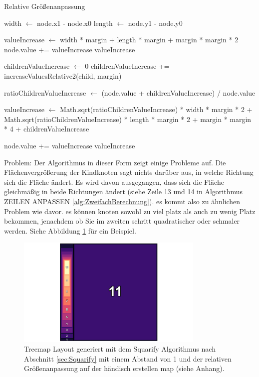 \begin{algorithm}[H]
\caption{Relative Größenanpassung}
\label{alg:ZweifachBerechnung}
\begin{algorithmic}[1]
    \State width $\gets$ node.x1 - node.x0
    \State length $\gets$ node.y1 - node.y0

        \State valueIncrease $\gets$ width * margin + length * margin + margin * margin * 2
        \State node.value += valueIncrease
        \State \Return valueIncrease
    \EndIf

    \State childrenValueIncrease $\gets$ 0
            \State childrenValueIncrease += increaseValuesRelative2(child, margin)
        \EndFor
    \EndIf

    \State ratioChildrenValueIncrease $\gets$ (node.value + childrenValueIncrease) / node.value

    \State valueIncrease $\gets$ 
        Math.sqrt(ratioChildrenValueIncrease) * width * margin * 2 +
        Math.sqrt(ratioChildrenValueIncrease) * length * margin * 2 +
    margin * margin * 4 +
        childrenValueIncrease

    \State node.value += valueIncrease
    \State \Return valueIncrease
\EndFunction
\end{algorithmic}
\end{algorithm}

Problem:
Der Algorithmus in dieser Form zeigt einige Probleme auf. Die Flächenvergrößerung der Kindknoten sagt nichts darüber aus, in welche Richtung sich die Fläche ändert. Es wird davon ausgegangen, dass sich die Fläche gleichmäßig in beide Richtungen ändert (siehe Zeile 13 und 14 in Algorithmus ZEILEN ANPASSEN  \ref{alg:ZweifachBerechnung}). 
es kommt also zu ähnlichen Problem wie davor. es können knoten sowohl zu viel platz als auch zu wenig Platz bekommen, jenachdem ob Sie im zweiten schritt quadratischer oder schmaler werden.  Siehe Abbildung \ref{fig:relativeIncreaseMarginOne} für ein Beispiel.

\begin{figure}
    \centering
    \includegraphics[width=0.8\textwidth]{images/increaseMarginOne.png}
    \caption{Treemap Layout generiert mit dem Squarify Algorithmus nach Abschnitt \ref{sec:Squarify} mit einem Abstand von 1 und der relativen Größenanpassung auf der händisch erstellen map (siehe Anhang).}
    \label{fig:relativeIncreaseMarginOne}
\end{figure}

